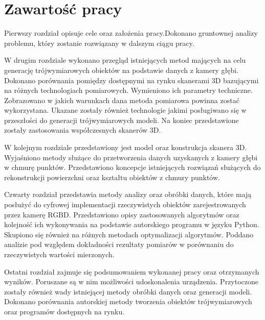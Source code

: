 \section{Zawartość pracy}
Pierwszy rozdział opisuje cele oraz założenia pracy.Dokonano gruntownej analizy problemu, który zostanie rozwiązany w dalszym ciągu pracy.

W drugim rozdziale wykonano przegląd istniejących metod mających na celu generację trójwymiarowych obiektów na podstawie danych z kamery głębi. Dokonano porównania pomiędzy dostępnymi na rynku skanerami 3D bazującymi na różnych technologiach pomiarowych. Wymieniono ich parametry techniczne. Zobrazowano w jakich warunkach dana metoda pomiarowa powinna zostać wykorzystana. Ukazane zostały również technologie jakimi posługiwano się w przeszłości do generacji trójwymiarowych modeli. Na koniec przedstawione zostały zastosowania współczesnych skanerów 3D.

W kolejnym rozdziale przedstawiony jest model oraz konstrukcja skanera 3D. Wyjaśniono metody służące do przetworzenia danych uzyskanych z kamery głębi w chmurę punktów. Przedstawiono koncepcje istniejących rozwiązań służących do rekonstrukcji powierzchni oraz kształtu obiektów z chmury punktów.

Czwarty rozdział przedstawia metody analizy oraz obróbki danych, które mają posłużyć do cyfrowej implementacji rzeczywistych obiektów zarejestrowanych przez kamerę RGBD. Przedstawiono opisy zastosowanych algorytmów oraz kolejność ich wykonywania na podstawie autorskiego programu w języku Python. Skupiono się również na różnych metodach optymalizacji algorytmów. Poddano analizie pod względem dokładności rezultaty pomiarów w porównaniu do rzeczywistych wartości mierzonych.

Ostatni rozdział zajmuje się podsumowaniem wykonanej pracy oraz otrzymanych wyników. Poruszane są w nim możliwości udoskonalenia urządzenia. Przytoczone zostały również wady istniejącej metody obróbki danych oraz generacji modeli. Dokonano porównania autorskiej metody tworzenia obiektów trójwymiarowych oraz programów dostępnych na rynku.

